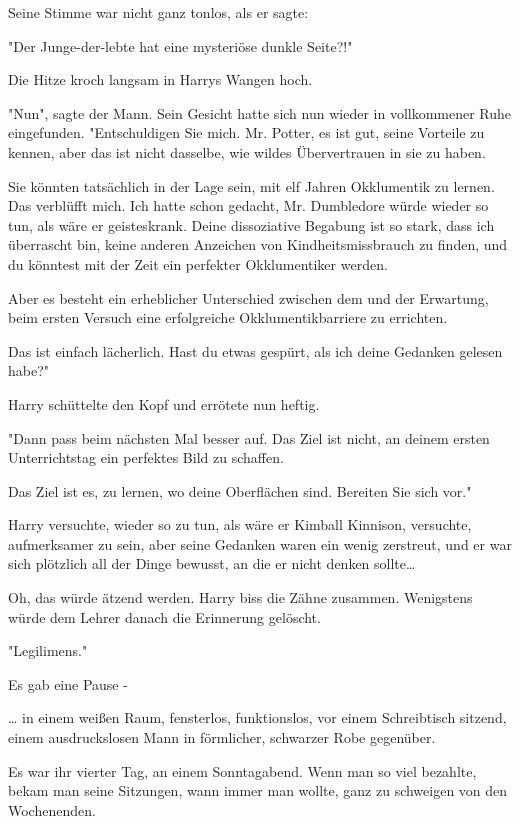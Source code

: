 {Seine Stimme war nicht ganz tonlos, als er sagte:

"Der Junge-der-lebte hat eine mysteriöse dunkle Seite?!"

Die Hitze kroch langsam in Harrys Wangen hoch.

"Nun", sagte der Mann. Sein Gesicht hatte sich nun wieder in vollkommener Ruhe eingefunden. "Entschuldigen Sie mich. Mr. Potter, es ist gut, seine Vorteile zu kennen, aber das ist nicht dasselbe, wie wildes Übervertrauen in sie zu haben.

Sie könnten tatsächlich in der Lage sein, mit elf Jahren Okklumentik zu lernen. Das verblüfft mich. Ich hatte schon gedacht, Mr. Dumbledore würde wieder so tun, als wäre er geisteskrank. Deine dissoziative Begabung ist so stark, dass ich überrascht bin, keine anderen Anzeichen von Kindheitsmissbrauch zu finden, und du könntest mit der Zeit ein perfekter Okklumentiker werden.

Aber es besteht ein erheblicher Unterschied zwischen dem und der Erwartung, beim ersten Versuch eine erfolgreiche Okklumentikbarriere zu errichten.

Das ist einfach lächerlich. Hast du etwas gespürt, als ich deine Gedanken gelesen habe?"

Harry schüttelte den Kopf und errötete nun heftig.

"Dann pass beim nächsten Mal besser auf. Das Ziel ist nicht, an deinem ersten Unterrichtstag ein perfektes Bild zu schaffen.

Das Ziel ist es, zu lernen, wo deine Oberflächen sind. Bereiten Sie sich vor."

Harry versuchte, wieder so zu tun, als wäre er Kimball Kinnison, versuchte, aufmerksamer zu sein, aber seine Gedanken waren ein wenig zerstreut, und er war sich plötzlich all der Dinge bewusst, an die er nicht denken sollte…

Oh, das würde ätzend werden. Harry biss die Zähne zusammen. Wenigstens würde dem Lehrer danach die Erinnerung gelöscht.

"Legilimens."

Es gab eine Pause -

… in einem weißen Raum, fensterlos, funktionslos, vor einem Schreibtisch sitzend, einem ausdruckslosen Mann in förmlicher, schwarzer Robe gegenüber.

Es war ihr vierter Tag, an einem Sonntagabend. Wenn man so viel bezahlte, bekam man seine Sitzungen, wann immer man wollte, ganz zu schweigen von den Wochenenden.

}
